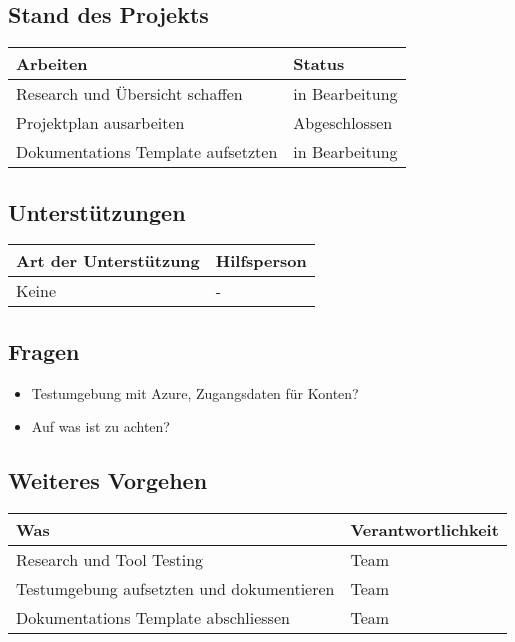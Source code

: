 \subsection*{Stand des Projekts}
\begin{table}[H]
    \centering
    \begin{tabular}{p{12cm} p{4cm}}
        \textbf{Arbeiten} & \textbf{Status} \\ \hline
        Research und Übersicht schaffen & in Bearbeitung \\ \hline
        Projektplan ausarbeiten & Abgeschlossen \\ \hline
        Dokumentations Template aufsetzten & in Bearbeitung \\ \hline
    \end{tabular}
\end{table}

\vspace{1cm}

\subsection*{Unterstützungen}
\begin{table}[H]
    \centering
    \begin{tabular}{p{12cm} p{4cm}}
        \textbf{Art der Unterstützung} & \textbf{Hilfsperson} \\ \hline
        Keine & - \\ \hline
    \end{tabular}
\end{table}

\vspace{1cm}

\subsection*{Fragen}
\begin{itemize}
    \item Testumgebung mit Azure, Zugangsdaten für Konten?
    \item Auf was ist zu achten?


\end{itemize}

\vspace{1cm}

\subsection*{Weiteres Vorgehen}
\begin{table}[H]
    \centering
    \begin{tabular}{p{12cm} p{4cm}}
        \textbf{Was} & \textbf{Verantwortlichkeit} \\ \hline
        Research und Tool Testing & Team \\ \hline
        Testumgebung aufsetzten und dokumentieren & Team \\ \hline
        Dokumentations Template abschliessen & Team \\ \hline
    \end{tabular}
\end{table}

